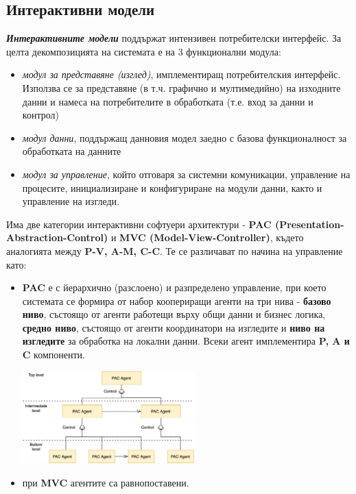 \documentclass[fleqn,12pt]{article}
\begin{document}
\subsection{Интерактивни модели}

\textbf{\textit{Интерактивните модели}} поддържат интензивен потребителски интерфейс.
За целта декомпозицията на системата е на 3 функционални модула:
\begin{itemize}
    \item \textit{модул за представяне (изглед)}, имплементиращ потребителския интерфейс.
    Използва се за представяне (в т.ч. графично и мултимедийно) на изходните данни и намеса на потребителите в обработката (т.е. вход за данни и контрол)
    \item \textit{модул данни}, поддържащ данновия модел заедно с базова функционалност за обработката на данните
    \item \textit{модул за управление}, който отговаря за системни комуникации, управление на процесите, инициализиране и конфигуриране на модули данни, както и управление на изгледи.
\end{itemize}

Има две категории интерактивни софтуери архитектури - \textbf{PAC (Presentation-Abstraction-Control)} и \textbf{MVC (Model-View-Controller)}, където аналогията между \textbf{P-V, A-M, C-C}.
Те се различават по начина на управление като:
\begin{itemize}
    \item \textbf{PAC} е с йерархично (разслоено) и разпределено управление, при което системата се формира от набор коопериращи агенти на три нива - \textbf{базово ниво}, състоящо от агенти работещи върху общи данни и бизнес логика, \textbf{средно ниво}, състоящо от агенти координатори на изгледите и \textbf{ниво на изгледите} за обработка на локални данни.
    Всеки агент имплементира \textbf{P, A и C} компоненти.
    \begin{center} \includegraphics[width=250px]{pac.png} \end{center}
    \item при \textbf{MVC} агентите са равнопоставени.
\end{itemize}
\end{document}
